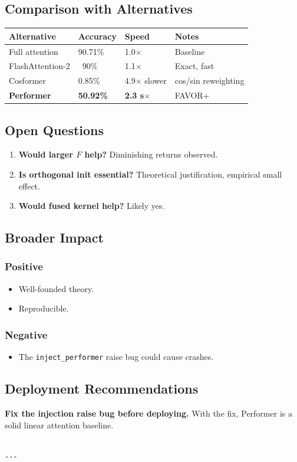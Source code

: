 \subsection{Comparison with Alternatives}

\begin{table}[H]
\centering
\small
\begin{tabular}{llll}
\toprule
\textbf{Alternative} & \textbf{Accuracy} & \textbf{Speed} & \textbf{Notes} \\
\midrule
Full attention & 90.71\% & 1.0$\times$ & Baseline \\
FlashAttention-2 & ~90\% & 1.1$\times$ & Exact, fast \\
Cosformer & 0.85\% & 4.9$\times$ slower & cos/sin reweighting \\
\textbf{Performer} & \textbf{50.92\%} & \textbf{2.3 s$\times$} & FAVOR+ \\
\bottomrule
\end{tabular}
\end{table}

\subsection{Open Questions}

\begin{enumerate}
\item \textbf{Would larger $F$ help?} Diminishing returns observed.
\item \textbf{Is orthogonal init essential?} Theoretical justification, empirical
  small effect.
\item \textbf{Would fused kernel help?} Likely yes.

\end{enumerate}
\subsection{Broader Impact}

\subsubsection{Positive}

\begin{itemize}
\item Well-founded theory.
\item Reproducible.

\end{itemize}
\subsubsection{Negative}

\begin{itemize}
\item The \texttt{inject\_performer} raise bug could cause crashes.

\end{itemize}
\subsection{Deployment Recommendations}

\textbf{Fix the injection raise bug before deploying.} With the fix, Performer 
is a solid linear attention baseline.
\begin{lstlisting}

---
\end{lstlisting}